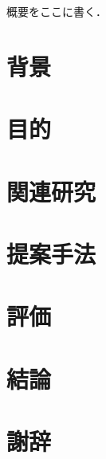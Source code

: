 \documentclass[a4paper,12pt]{jsarticle}
\date{平成xx年3月}
\begin{document}
\Front %
\MakeTitlePage

\begin{Abstract}
概要をここに書く．
\end{Abstract}

\TableOfContents

\Main %

\section{背景}

\section{目的}

\section{関連研究}

\section{提案手法}

\section{評価}

\section{結論}

\section*{謝辞}

\begin{thebibliography}{99}

\end{thebibliography}
\end{document}
